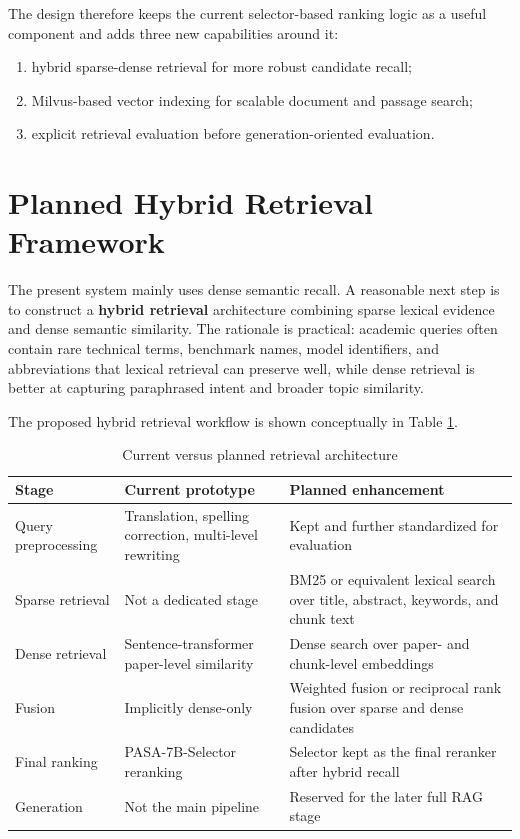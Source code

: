 \documentclass[11pt,a4paper,oneside]{report}
\begin{document}
The design therefore keeps the current selector-based ranking logic as a useful
component and adds three new capabilities around it:

\begin{enumerate}
  \item hybrid sparse-dense retrieval for more robust candidate recall;
  \item Milvus-based vector indexing for scalable document and passage search;
  \item explicit retrieval evaluation before generation-oriented evaluation.
\end{enumerate}

\section{Planned Hybrid Retrieval Framework}

The present system mainly uses dense semantic recall. A reasonable next step is to
construct a \textbf{hybrid retrieval} architecture combining sparse lexical evidence and
dense semantic similarity. The rationale is practical: academic queries often contain
rare technical terms, benchmark names, model identifiers, and abbreviations that
lexical retrieval can preserve well, while dense retrieval is better at capturing
paraphrased intent and broader topic similarity.

The proposed hybrid retrieval workflow is shown conceptually in Table
\ref{tab:current-vs-planned}.

\begin{table}[htbp]
\centering
\caption{Current versus planned retrieval architecture}
\label{tab:current-vs-planned}
\begin{tabularx}{\textwidth}{>{\raggedright\arraybackslash}p{3.1cm} >{\raggedright\arraybackslash}X >{\raggedright\arraybackslash}X}
\toprule
Stage & Current prototype & Planned enhancement \\
\midrule
Query preprocessing & Translation, spelling correction, multi-level rewriting & Kept and further standardized for evaluation \\
Sparse retrieval & Not a dedicated stage & BM25 or equivalent lexical search over title, abstract, keywords, and chunk text \\
Dense retrieval & Sentence-transformer paper-level similarity & Dense search over paper- and chunk-level embeddings \\
Fusion & Implicitly dense-only & Weighted fusion or reciprocal rank fusion over sparse and dense candidates \\
Final ranking & PASA-7B-Selector reranking & Selector kept as the final reranker after hybrid recall \\
Generation & Not the main pipeline & Reserved for the later full RAG stage \\
\bottomrule
\end{tabularx}
\end{table}
\end{document}

